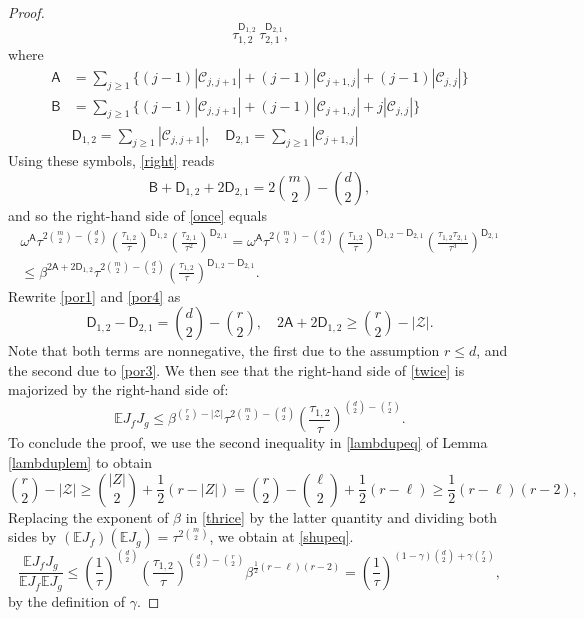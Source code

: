 \documentclass[reqno]{amsart}
\theoremstyle{theorem}
\theoremstyle{definition}
\theoremstyle{remark}
\def\E{\mathbb{E}}
\def\CC{\mathscr{C}}
\newcommand{\1}{{\text{\Large $\mathfrak 1$}}}	%
\numberwithin{equation}{section}
\def\ZZ{\mathscr Z}
\begin{document}
\begin{proof}
\begin{equation}
\, \tau_{1,2}^{\mathsf D_{1,2}}
\, \tau_{2,1}^{\mathsf D_{2,1}},
\end{equation}
where
\begin{align*}
\mathsf A &= \sum_{j \ge 1} 
\big\{(j-1) |\CC_{j,j+1}| + (j-1) |\CC_{j+1,j}| + (j-1) |\CC_{j,j}| \big\}
\\
\mathsf B &= \sum_{j \ge 1} 
\big\{(j-1) |\CC_{j,j+1}| + (j-1) |\CC_{j+1,j}| + j |\CC_{j,j}| \big\}
\\ & \mathsf D_{1,2} = \sum_{j \ge 1} |\CC_{j,j+1}|, \quad
\mathsf D_{2,1} = \sum_{j \ge 1} |\CC_{j+1,j}|
\end{align*}
Using these symbols, \eqref{right} reads
\[
\mathsf B + \mathsf D_{1,2} + 2 \mathsf D_{2,1} = 2 \binom{m}{2}-\binom{d}{2},
\]
and so the right-hand side of \eqref{once} equals
\begin{align}
\omega^{\mathsf A} \tau^{2 \binom{m}{2}-\binom{d}{2}}
\left(\frac{\tau_{1,2}}{\tau}\right)^{\mathsf D_{1,2}} 
\left(\frac{\tau_{2,1}}{\tau^2}\right)^{\mathsf D_{2,1}} 
=
\omega^{\mathsf A} \tau^{2 \binom{m}{2}-\binom{d}{2}}
\left(\frac{\tau_{1,2}}{\tau}\right)^{\mathsf D_{1,2}-\mathsf D_{2,1}}
\left(\frac{\tau_{1,2}\tau_{2,1}}{\tau^3}\right)^{\mathsf D_{2,1}} 
\nonumber
\\
\le \beta^{2 \mathsf A+2 \mathsf D_{1,2}} \tau^{2 \binom{m}{2}-\binom{d}{2}}
\left(\frac{\tau_{1,2}}{\tau}\right)^{\mathsf D_{1,2}-\mathsf D_{2,1}} .
\label{twice}
\end{align}
Rewrite \eqref{por1} and \eqref{por4} as
\[
\mathsf D_{1,2}-\mathsf D_{2,1} = \binom{d}{2}-\binom{r}{2},
\quad
2 \mathsf A+2 \mathsf D_{1,2} \ge \binom{r}{2}-|\ZZ|.
\]
Note that both terms are nonnegative, the first due to the assumption
$r \le d$, and the second due to \eqref{por3}.
We then see that the right-hand side of 
\eqref{twice} is majorized by the right-hand side
of:
\begin{equation}
\label{thrice}
\E J_f J_g 
\le 
\beta^{\binom{r}{2}-|\ZZ|} \tau^{2\binom{m}{2}-\binom{d}{2}}
\left(\frac{\tau_{1,2}}{\tau}\right)^{\binom{d}{2}-\binom{r}{2}}.
\end{equation}
To conclude the proof, we use the second inequality 
in \eqref{lambdupeq} of Lemma \eqref{lambduplem} to obtain
\[
\binom{r}{2}-|\ZZ| \ge \binom{|Z|}{2}+\frac12 (r-|Z|)
= \binom{r}{2}- \binom{\ell}{2}+\frac12 (r-\ell)
\ge \frac12 (r-\ell)(r-2),
\]
Replacing the exponent of $\beta$ in \eqref{thrice} by the latter
quantity and
dividing both sides by $(\E J_f)(\E J_g) = \tau^{2\binom{m}{2}}$,
we obtain at \eqref{shupeq}.
\[
\frac{\E J_f J_g}{\E J_f \E J_g}
\le \left( \frac{1}{\tau} \right)^{\binom{d}{2}}
\left( \frac{\tau_{1,2}}{\tau} \right)^{\binom{d}{2} - \binom{r}{2}} 
\beta^{\frac{1}{2}(r - \ell)(r-2)}
=  \left( \frac{1}{\tau} \right)^{(1-\gamma)\binom{d}{2} + \gamma\binom{r}{2}},
\]
by the definition of $\gamma$.
\end{proof}
\end{document}
